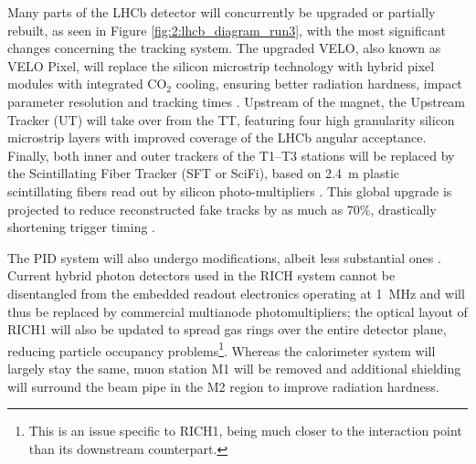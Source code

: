 Many parts of the LHCb detector will concurrently be upgraded or partially rebuilt, as seen in Figure \ref{fig:2:lhcb_diagram_run3}, with the most significant changes concerning the tracking system.
The upgraded VELO, also known as VELO Pixel, will replace the silicon microstrip technology with hybrid pixel modules with integrated CO$_2$ cooling, ensuring better radiation hardness, impact parameter resolution and tracking times \cite{Collaboration:1624070}.
Upstream of the magnet, the Upstream Tracker (UT) will take over from the TT, featuring four high granularity silicon microstrip layers with improved coverage of the LHCb angular acceptance. Finally, both inner and outer trackers of the T1--T3 stations will be replaced by the Scintillating Fiber Tracker (SFT or SciFi), based on \SI{2.4}{\meter} plastic scintillating fibers read out by silicon photo-multipliers \cite{Collaboration:1647400}.
This global upgrade is projected to reduce reconstructed fake tracks by as much as $70\%$, drastically shortening trigger timing \cite{Piucci_2017}.

The PID system will also undergo modifications, albeit less substantial ones \cite{Collaboration:1624074}.
Current hybrid photon detectors used in the RICH system cannot be disentangled from the embedded readout electronics operating at \SI{1}{\mega\hertz} and will thus be replaced by commercial multianode photomultipliers;
the optical layout of RICH1 will also be updated to spread gas rings over the entire detector plane, reducing particle occupancy problems\footnote{This is an issue specific to RICH1, being much closer to the interaction point than its downstream counterpart.}.
Whereas the calorimeter system will largely stay the same, muon station M1 will be removed and additional shielding will surround the beam pipe in the M2 region to improve radiation hardness.

